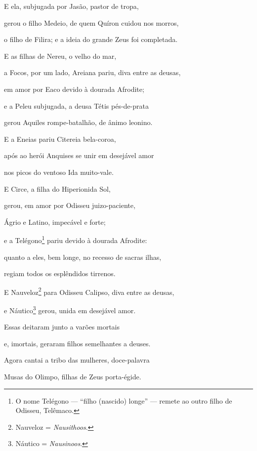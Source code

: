 \begin{pages}
\begin{Rightside}
E ela, subjugada por Jasão, pastor de tropa, 

gerou o filho Medeio, de quem Quíron cuidou nos morros,

o filho de Filira; e a ideia do grande Zeus foi completada.

\quad{}E as filhas de Nereu, o velho do mar,

a Focos, por um lado, Areiana pariu, diva entre as deusas,

em amor por Eaco devido à dourada Afrodite; 

e a Peleu subjugada, a deusa Tétis pés-de-prata

gerou Aquiles rompe-batalhão, de ânimo leonino.

\quad{}E a Eneias pariu Citereia bela-coroa,

após ao herói Anquises se unir em desejável amor

nos picos do ventoso Ida muito-vale. 

\quad{}E Circe, a filha do Hiperionida Sol,

gerou, em amor por Odisseu juizo-paciente,

Ágrio e Latino, impecável e forte;

e a Telégono\footnote{O nome Telégono --- ``filho (nascido) longe'' --- remete ao outro filho de Odisseu, Telêmaco.} pariu devido à dourada Afrodite:

quanto a eles, bem longe, no recesso de sacras ilhas, 

regiam todos os esplêndidos tirrenos.

\quad{}E Nauveloz\footnote{Nauveloz = \emph{Nausithoos}.} para Odisseu Calipso, diva entre as deusas,

e Náutico\footnote{Náutico = \emph{Nausinoos}.} gerou, unida em desejável amor.

\quad{}Essas deitaram junto a varões mortais

e, imortais, geraram filhos semelhantes a deuses. 

Agora cantai a tribo das mulheres, doce-palavra

Musas do Olimpo, filhas de Zeus porta-égide.            
            \pend
         \endnumbering
    \end{Rightside}
\end{pages}
\Pages